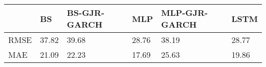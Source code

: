 \begin{tabular}{llllll}
\toprule
 & BS & BS-GJR-GARCH & MLP & MLP-GJR-GARCH & LSTM \\
\midrule
RMSE & 37.82 & 39.68 & 28.76 & 38.19 & 28.77 \\
MAE & 21.09 & 22.23 & 17.69 & 25.63 & 19.86 \\
\bottomrule
\end{tabular}
